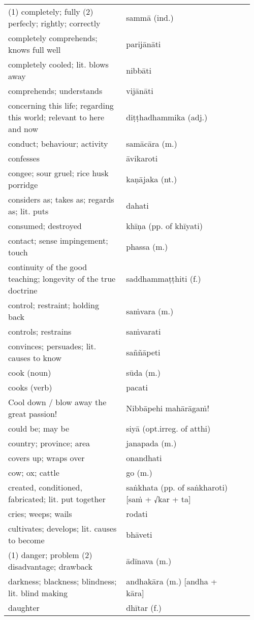 \documentclass[a5paper]{memoir}
\begin{document}
\begin{longtable}{L{0.48\linewidth} L{0.48\linewidth} H}
(1) completely; fully (2) perfecly; rightly; correctly & sammā (ind.) & \\
completely comprehends; knows full well & parijānāti & \\
completely cooled; lit. blows away & nibbāti & \\
comprehends; understands & vijānāti & \\
concerning this life; regarding this world; relevant to here and now & diṭṭhadhammika (adj.) & \\
conduct; behaviour; activity & samācāra (m.) & \\
confesses & āvikaroti & \\
congee; sour gruel; rice husk porridge & kaṇājaka (nt.) & \\
considers as; takes as; regards as; lit. puts & dahati & \\
consumed; destroyed & khīṇa (pp. of khīyati) & \\
contact; sense impingement; touch & phassa (m.) & \\
continuity of the good teaching; longevity of the true doctrine & saddhammaṭṭhiti (f.) & \\
control; restraint; holding back & saṁvara (m.) & \\
controls; restrains & saṁvarati & \\
convinces; persuades; lit. causes to know & saññāpeti & \\
cook (noun) & sūda (m.) & \\
cooks (verb) & pacati & \\
Cool down / blow away the great passion! & Nibbāpehi mahārāgaṁ! & \\
could be; may be & siyā (opt.irreg. of atthi) & \\
country; province; area & janapada (m.) & \\
covers up; wraps over & onandhati & \\
cow; ox; cattle & go (m.) & \\
created, conditioned, fabricated; lit. put together & saṅkhata (pp. of saṅkharoti) [saṁ + √kar + ta] & \\
cries; weeps; wails & rodati & \\
cultivates; develops; lit. causes to become & bhāveti & \\
(1) danger; problem (2) disadvantage; drawback & ādīnava (m.) & \\
darkness; blackness; blindness; lit. blind making & andhakāra (m.) [andha + kāra] & \\
daughter & dhītar (f.) & \\

\end{longtable}
\end{document}
